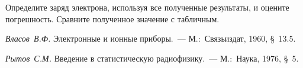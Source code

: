 \begin{lab:task}
	\item Определите заряд электрона, используя все полученные результаты, и
оцените погрешность. Сравните полученное значение
с табличным.
\end{lab:task}


\begin{lab:literature}
	\item \emph{Власов~В.Ф.} Электронные и ионные приборы.~--- М.:~Связьиздат,
1960, \S~13.5.

	\item \emph{Рытов~С.М.} Введение в статистическую радиофизику.~---
М.:~Наука, 1976, \S~5.
\end{lab:literature}
